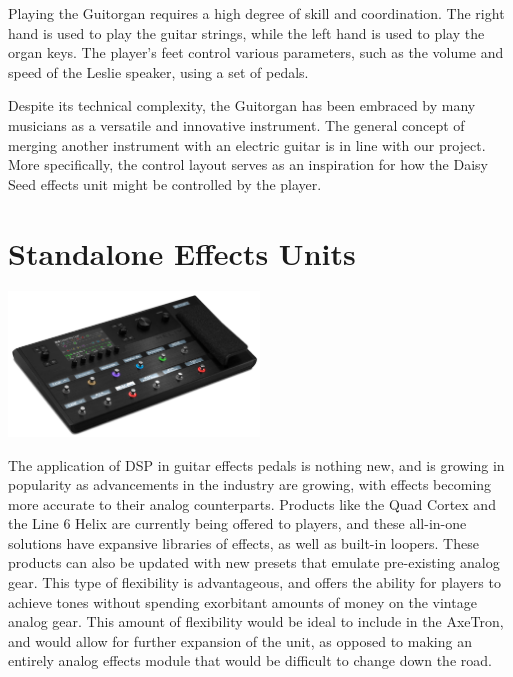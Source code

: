 \documentclass[]{MSword}
\begin{document}
\par{Playing the Guitorgan requires a high degree of skill and coordination. The right hand is used to play the guitar strings, while the left hand is used to play the organ keys. The player's feet control various parameters, such as the volume and speed of the Leslie speaker, using a set of pedals.}

\par{Despite its technical complexity, the Guitorgan has been embraced by many musicians as a versatile and innovative instrument. The general concept of merging another instrument with an electric guitar is in line with our project. More specifically, the control layout serves as an inspiration for how the Daisy Seed effects unit might be controlled by the player.}

\section{Standalone Effects Units}

\begin{center}
  \includegraphics[width=0.5\textwidth]{img/helix.png}
\end{center}

\par{The application of DSP in guitar effects pedals is nothing new, and is growing in popularity as advancements in the industry are growing, with effects becoming more accurate to their analog counterparts. Products like the Quad Cortex\cite{quadcortex} and the Line 6 Helix\cite{line6helix} are currently being offered to players, and these all-in-one solutions have expansive libraries of effects, as well as built-in loopers. These products can also be updated with new presets that emulate pre-existing analog gear. This type of flexibility is advantageous, and offers the ability for players to achieve tones without spending exorbitant amounts of money on the vintage analog gear. This amount of flexibility would be ideal to include in the AxeTron, and would allow for further expansion of the unit, as opposed to making an entirely analog effects module that would be difficult to change down the road. }

\printbibliography
\end{document}
